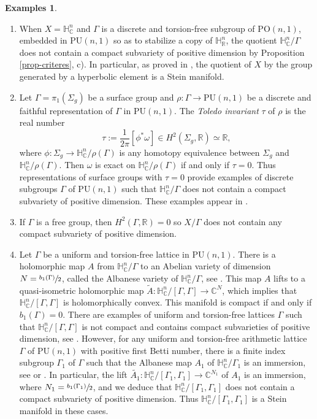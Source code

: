 \documentclass[JEP,XML,SOM,Unicode,NoEqCountersInSection,published]{cedram}
\theoremstyle{definition}
\newtheorem*{examples}{Examples}
\newcommand{\C}{\mathbb{C}}
\newcommand{\R}{\mathbb{R}}
\newcommand{\HNC}{\mathbb{H}^{n}_{\C}}
\newcommand{\HNR}{\mathbb{H}^{n}_{\R}}
\newcommand{\PU}{\mathrm{PU}}
\newcommand{\PO}{\mathrm{PO}}
\def\C{\mathbb{C}}
\newcommand{\HNC}{\mathbb{H}^{n}_{\C}}
\newcommand{\PU}{\mathrm{PU}}
\begin{document}
\skpt
\begin{examples}
\begin{enumerate}
\item When $X=\HNC$ and $\Gamma$ is a discrete and torsion-free subgroup of $\PO(n,1)$, embedded in $\PU(n,1)$ so as to stabilize a copy of $\HNR$, the quotient $\HNC/\Gamma$ does not contain a compact subvariety of positive dimension by Proposition \ref{prop-criteres}, c). In particular, as proved in \cite{chenDiscreteGroupsHolomorphic2013}, the quotient of $X$ by the group generated by a hyperbolic element is a Stein manifold.
\item Let $\Gamma=\pi_1(\Sigma_g)$ be a surface group and $\rho:\Gamma \to \PU(n,1)$ be a discrete and faithful representation of $\Gamma$ in $\PU(n,1)$. The \textit{Toledo invariant} $\tau$ of $\rho$ is the real number
\begin{equation*}
\tau:= \frac{1}{2\pi}[\phi^{*}\omega] \in H^{2}(\Sigma_g,\R) \simeq \R,
\end{equation*}
where $\phi: \Sigma_g \to \HNC/\rho(\Gamma)$ is any homotopy equivalence between $\Sigma_g$ and $\HNC/\rho(\Gamma)$. Then $\omega$ is exact on $\HNC/\rho(\Gamma)$ if and only if $\tau=0$. Thus representations of surface groups with $\tau=0$ provide examples of discrete subgroups $\Gamma$ of $\PU(n,1)$ such that $\HNC/\Gamma$ does not contain a compact subvariety of positive dimension. These examples appear in \cite[p.\,27]{kapovichSurveyComplexHyperbolic2022}.
\item If $\Gamma$ is a free group, then $H^{2}(\Gamma,\R)=0$ so $X/\Gamma$ does not contain any compact subvariety of positive dimension.
\item Let $\Gamma$ be a uniform and torsion-free lattice in $\PU(n,1)$. There is a holomorphic map $A$ from $\HNC/\Gamma$ to an Abelian variety of dimension $N=\sfrac{b_1(\Gamma)}{2}$, called the Albanese variety of $\HNC/\Gamma$, see \cite[Ch.\,12]{voisinTheorieHodgeGeometrie2002}. This map $A$ lifts to a quasi-isometric holomorphic map $\widetilde{A}: \HNC/[\Gamma,\Gamma] \to \C^{N}$, which implies that $\HNC/[\Gamma,\Gamma]$ is holomorphically convex. This manifold is compact if and only if $b_1(\Gamma)=0$. There are examples of uniform and torsion-free lattices $\Gamma$ such that $\HNC/[\Gamma,\Gamma]$ is not compact and contains compact subvarieties of positive dimension, see \cite{cartwrightCartwrightStegerSurface2017}. However, for any uniform and torsion-free arithmetic lattice $\Gamma$ of $\PU(n,1)$ with positive first Betti number, there is a finite index subgroup $\Gamma_1$ of $\Gamma$ such that the Albanese map $A_1$ of $\HNC/\Gamma_1$ is an immersion, see \cite[\S 3.1]{llosaisenrichSubgroupsHyperbolicGroups2024} or \cite{eyssidieuxOrbifoldKahlerGroups2018}. In particular, the lift $\widetilde{A_1}:\HNC/[\Gamma_1,\Gamma_1] \to \C^{N_1}$ of $A_1$ is an immersion, where $N_1=\sfrac{b_1(\Gamma_1)}{2}$, and we deduce that $\HNC/[\Gamma_1,\Gamma_1]$ does not contain a compact subvariety of positive dimension. Thus $\HNC/[\Gamma_1,\Gamma_1]$ is a Stein manifold in these cases.
\end{enumerate}

\end{examples}
\end{document}
